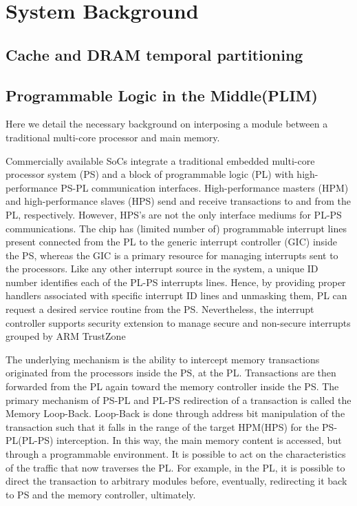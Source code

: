 \section{System Background}
\subsection{Cache and DRAM temporal partitioning}

\subsection{Programmable Logic in the Middle(PLIM)}
    Here we detail the necessary background on interposing a module between a traditional multi-core processor and main memory.

    Commercially available SoCs integrate a traditional embedded multi-core processor system (PS) and a block of programmable logic (PL) with high-performance PS-PL communication interfaces. High-performance masters (HPM) and high-performance slaves (HPS) send and receive transactions to and from the PL, respectively. However, HPS's are not the only interface mediums for PL-PS communications. The chip has (limited number of) programmable interrupt lines present connected from the PL to the generic interrupt controller (GIC) inside the PS, whereas the GIC is a primary resource for managing interrupts sent to the processors. Like any other interrupt source in the system, a unique ID number identifies each of the PL-PS interrupts lines. Hence, by providing proper handlers associated with specific interrupt ID lines and unmasking them, PL can request a desired service routine from the PS. Nevertheless, the interrupt controller supports security extension to manage secure and non-secure interrupts grouped by  ARM TrustZone



    The underlying mechanism is the ability to intercept memory transactions originated from the processors inside the PS, at the PL. Transactions are then forwarded from the PL again toward the memory controller inside the PS. The primary mechanism of PS-PL and PL-PS redirection of a transaction is called the Memory Loop-Back. Loop-Back is done through address bit manipulation of the transaction such that it falls in the range of the target HPM(HPS) for the PS-PL(PL-PS) interception. In this way, the main memory content is accessed, but through a programmable environment. It is possible to act on the characteristics of the traffic that now traverses the PL. For example, in the PL, it is possible to direct the transaction to arbitrary modules before, eventually, redirecting it back to PS and the memory controller, ultimately.

